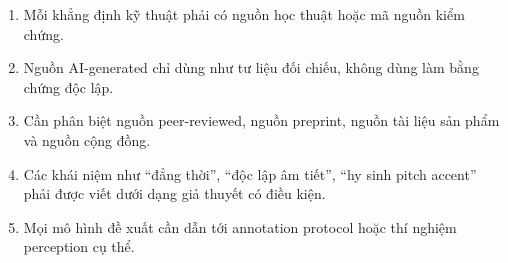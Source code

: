 \documentclass[12pt,a4paper]{article}
\begin{document}
\begin{enumerate}
  \item Mỗi khẳng định kỹ thuật phải có nguồn học thuật hoặc mã nguồn kiểm chứng.
  \item Nguồn AI-generated chỉ dùng như tư liệu đối chiếu, không dùng làm bằng chứng độc lập.
  \item Cần phân biệt nguồn peer-reviewed, nguồn preprint, nguồn tài liệu sản phẩm và nguồn cộng đồng.
  \item Các khái niệm như 
  \enquote{đẳng thời}, 
  \enquote{độc lập âm tiết}, 
  \enquote{hy sinh pitch accent} phải được viết dưới dạng giả thuyết có điều kiện.
  \item Mọi mô hình đề xuất cần dẫn tới annotation protocol hoặc thí nghiệm perception cụ thể.
\end{enumerate}

\newpage
\printbibliography
\end{document}
